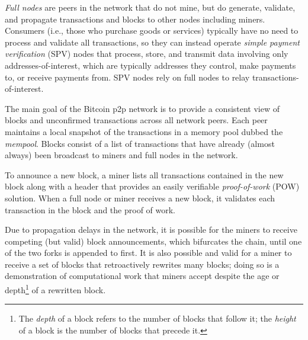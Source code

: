 \emph{Full nodes} are peers in the network that do not mine, but do
generate, validate, and propagate transactions and blocks to other
nodes including miners. Consumers (i.e., those who purchase goods or
services) typically have no need to process and validate all
transactions, so they can instead operate \emph{simple payment
  verification} (SPV) nodes that process, store, and transmit data
involving only addresses-of-interest, which are typically addresses
they control, make payments to, or receive payments from. SPV nodes
rely on full nodes to relay transactions-of-interest.


The main goal of the Bitcoin p2p network is to provide a consistent
view of blocks and unconfirmed transactions across all network peers.
Each peer maintains a local snapshot of the transactions in a memory
pool dubbed the \emph{mempool}. Blocks consist of a list of
transactions that have already (almost always) been broadcast to
miners and full nodes in the network.

To announce a new block, a miner lists all transactions contained in
the new block along with a header that provides an easily verifiable
\emph{proof-of-work} (POW) solution.  When a full node or miner receives a new block, it
validates each transaction in the block and the proof of work.

Due to propagation delays in the network, it is possible for the
miners to receive competing (but valid) block announcements, which
bifurcates the chain, until one of the two forks is appended to
first. It is also possible and valid for a miner to receive a set of
blocks that retroactively rewrites many blocks; doing so is a
demonstration of computational work that miners accept despite the age
or depth\footnote{The \emph{depth} of a block refers to the number of
  blocks that follow it; the \emph{height} of a block is the number of
  blocks that precede it.} of a rewritten block.

